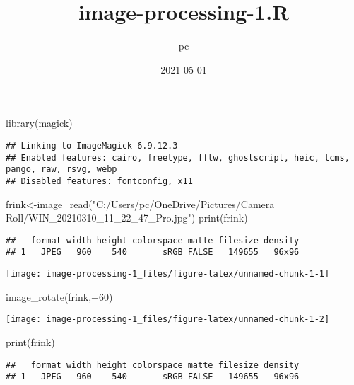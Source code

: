 \documentclass[
]{article}
\title{image-processing-1.R}
\author{pc}
\date{2021-05-01}
\newenvironment{Shaded}{\begin{snugshade}}{\end{snugshade}}
\newcommand{\DecValTok}[1]{\textcolor[rgb]{0.00,0.00,0.81}{#1}}
\newcommand{\FunctionTok}[1]{\textcolor[rgb]{0.00,0.00,0.00}{#1}}
\newcommand{\NormalTok}[1]{#1}
\newcommand{\OtherTok}[1]{\textcolor[rgb]{0.56,0.35,0.01}{#1}}
\newcommand{\SpecialCharTok}[1]{\textcolor[rgb]{0.00,0.00,0.00}{#1}}
\newcommand{\StringTok}[1]{\textcolor[rgb]{0.31,0.60,0.02}{#1}}
\begin{document}
\maketitle

\begin{Shaded}
\begin{Highlighting}[]
\FunctionTok{library}\NormalTok{(magick)}
\end{Highlighting}
\end{Shaded}

\begin{verbatim}
## Linking to ImageMagick 6.9.12.3
## Enabled features: cairo, freetype, fftw, ghostscript, heic, lcms, pango, raw, rsvg, webp
## Disabled features: fontconfig, x11
\end{verbatim}

\begin{Shaded}
\begin{Highlighting}[]
\NormalTok{frink}\OtherTok{\textless{}{-}}\FunctionTok{image\_read}\NormalTok{(}\StringTok{"C:/Users/pc/OneDrive/Pictures/Camera Roll/WIN\_20210310\_11\_22\_47\_Pro.jpg"}\NormalTok{)}
\FunctionTok{print}\NormalTok{(frink)}
\end{Highlighting}
\end{Shaded}

\begin{verbatim}
##   format width height colorspace matte filesize density
## 1   JPEG   960    540       sRGB FALSE   149655   96x96
\end{verbatim}

\texttt{[image: image-processing-1\_files/figure-latex/unnamed-chunk-1-1]}

\begin{Shaded}
\begin{Highlighting}[]
\FunctionTok{image\_rotate}\NormalTok{(frink,}\SpecialCharTok{+}\DecValTok{60}\NormalTok{)}
\end{Highlighting}
\end{Shaded}

\texttt{[image: image-processing-1\_files/figure-latex/unnamed-chunk-1-2]}

\begin{Shaded}
\begin{Highlighting}[]
\FunctionTok{print}\NormalTok{(frink)}
\end{Highlighting}
\end{Shaded}

\begin{verbatim}
##   format width height colorspace matte filesize density
## 1   JPEG   960    540       sRGB FALSE   149655   96x96
\end{verbatim}
\end{document}
